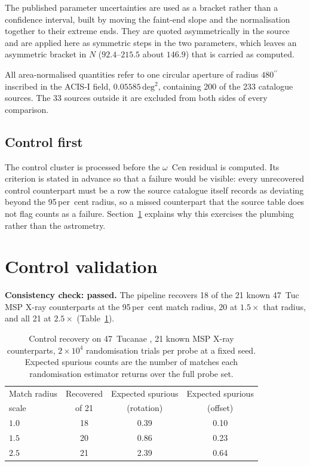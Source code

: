 \documentclass[11pt]{article}
\newcommand{\ocen}{$\omega$~Cen}
\newcommand{\as}{\ensuremath{^{\prime\prime}}}
\begin{document}
The published parameter uncertainties are used as a bracket rather than a confidence interval, built by moving the faint-end slope and the normalisation together to their extreme ends. They are quoted asymmetrically in the source and are applied here as symmetric steps in the two parameters, which leaves an asymmetric bracket in $N$ ($92.4$--$215.5$ about $146.9$) that is carried as computed.

All area-normalised quantities refer to one circular aperture of radius $480\as$ inscribed in the ACIS-I field, $0.05585\,\mathrm{deg^{2}}$, containing 200 of the 233 catalogue sources. The 33 sources outside it are excluded from both sides of every comparison.

\subsection{Control first}
\label{sec:method-controlfirst}

The control cluster is processed before the \ocen{} residual is computed. Its criterion is stated in advance so that a failure would be visible: every unrecovered control counterpart must be a row the source catalogue itself records as deviating beyond the 95\,per~cent radius, so a missed counterpart that the source table does not flag counts as a failure. Section~\ref{sec:control} explains why this exercises the plumbing rather than the astrometry.

\section{Control validation}
\label{sec:control}

\textbf{Consistency check: passed.} The pipeline recovers 18 of the 21 known 47~Tuc MSP X-ray counterparts at the 95\,per~cent match radius, 20 at $1.5\times$ that radius, and all 21 at $2.5\times$ (Table~\ref{tab:control}).

\begin{table}[tbp]
\centering
\small
\caption{Control recovery on 47~Tucanae \citep{Bhattacharya2017}, 21 known MSP X-ray counterparts, $2\times10^{4}$ randomisation trials per probe at a fixed seed. Expected spurious counts are the number of matches each randomisation estimator returns over the full probe set.}
\label{tab:control}
\begin{tabular}{lccc}
\toprule
Match radius & Recovered & Expected spurious & Expected spurious \\
scale & of 21 & (rotation) & (offset) \\
\midrule
$1.0$ & 18 & 0.39 & 0.10 \\
$1.5$ & 20 & 0.86 & 0.23 \\
$2.5$ & 21 & 2.39 & 0.64 \\
\bottomrule
\end{tabular}
\end{table}
\end{document}
